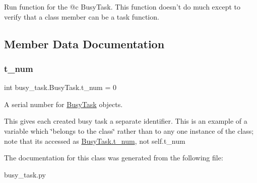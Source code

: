 \begin{DoxyVerb}Run function for the @c BusyTask.  This function doesn't do much
except to verify that a class member can be a task function. \end{DoxyVerb}
 

\subsection{Member Data Documentation}
\mbox{\label{classbusy__task_1_1_busy_task_a7d7e9e88981c6107ea8d652f8c2f3988}} 
\subsubsection{\texorpdfstring{t\_num}{t\_num}}
{\footnotesize\ttfamily int busy\+\_\+task.\+Busy\+Task.\+t\+\_\+num = 0\hspace{0.3cm}{\ttfamily [static]}}



A serial number for {\ttfamily \mbox{\hyperlink{classbusy__task_1_1_busy_task}{Busy\+Task}}} objects. 

This gives each created busy task a separate identifier. This is an example of a variable which \char`\"{}belongs to the class\char`\"{} rather than to any one instance of the class; note that it\textquotesingle{}s accessed as {\ttfamily \mbox{\hyperlink{classbusy__task_1_1_busy_task_a7d7e9e88981c6107ea8d652f8c2f3988}{Busy\+Task.\+t\+\_\+num}}}, not {\ttfamily self.\+t\+\_\+num} 

The documentation for this class was generated from the following file\+:\begin{DoxyCompactItemize}
\item 
busy\+\_\+task.\+py\end{DoxyCompactItemize}
